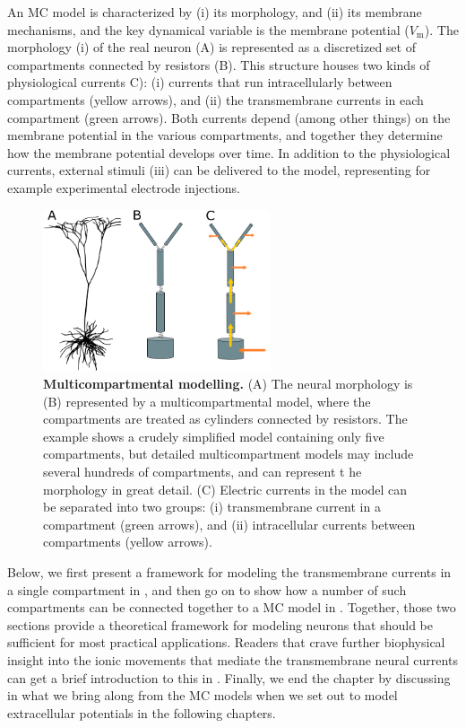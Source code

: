 An MC model is characterized by (i) its morphology, and (ii) its membrane mechanisms, and the key dynamical variable is the membrane potential ($V_\mathrm{m}$). The morphology (i) of the real neuron (A) is represented as a discretized set of compartments connected by resistors (B). This structure houses two kinds of physiological currents C): (i) currents that run intracellularly between compartments (yellow arrows), and (ii) the transmembrane currents in each compartment (green arrows). Both currents depend (among other things) on the membrane potential in the various compartments, and together they determine how the membrane potential develops over time. In addition to the physiological currents, external stimuli (iii) can be delivered to the model, representing for example experimental electrode injections. 


\begin{figure}[!ht]
\begin{center}
\includegraphics[width=0.6\textwidth]{Figures/Neuron/multicompartment.png}
\end{center}
\caption{\textbf{Multicompartmental modelling.}  (A) The neural morphology is (B) represented by a multicompartmental model, where the compartments are treated as cylinders connected by resistors. The example shows a crudely simplified model containing only five compartments, but detailed multicompartment models may include several hundreds of compartments, and can represent t he morphology in great detail. (C) Electric currents in the model can be separated into two groups: (i) transmembrane current in a compartment (green arrows), and (ii) intracellular currents between compartments (yellow arrows). 
}
\label{fig:Neuron:multicomp}
\end{figure}

Below, we first present a framework for modeling the transmembrane currents in a single compartment in , and then go on to show how a number of such compartments can be connected together to a MC model in . Together, those two sections provide a theoretical framework for modeling neurons that should be sufficient for most practical applications. Readers that crave further biophysical insight into the ionic movements that mediate the transmembrane neural currents can get a brief introduction to this in . Finally, we end the chapter by discussing in  what we bring along from the MC models when we set out to model extracellular potentials in the following chapters. 


